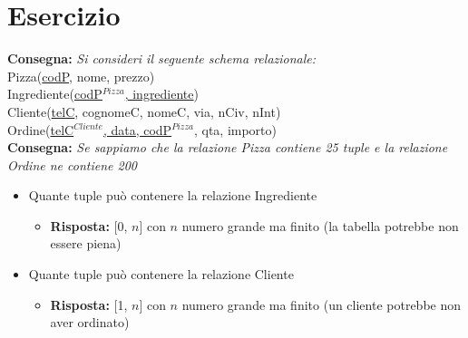 \documentclass[12pt]{article}
\begin{document}
\section{Esercizio}
\textbf{Consegna: }\textit{Si consideri il seguente schema relazionale:}\\
Pizza(\uline{codP}, nome, prezzo)\\
Ingrediente(\uline{codP$^{Pizza}$, ingrediente})\\
Cliente(\uline{telC}, cognomeC, nomeC, via, nCiv, nInt)\\
Ordine(\uline{telC$^{Cliente}$, data, codP$^{Pizza}$}, qta, importo)\\
\textbf{Consegna: }\textit{Se sappiamo che la relazione Pizza contiene 25 tuple e la relazione Ordine ne contiene 200}
\begin{itemize}
    \item Quante tuple può contenere la relazione Ingrediente
    \begin{itemize}
        \item \textbf{Risposta: } [0, $n$] con $n$ numero grande ma finito (la tabella potrebbe non essere piena)
    \end{itemize}
    \item Quante tuple può contenere la relazione Cliente
    \begin{itemize}
        \item \textbf{Risposta: } [1, $n$] con $n$ numero grande ma finito (un cliente potrebbe non aver ordinato)
    \end{itemize}
\end{itemize}
\end{document}
